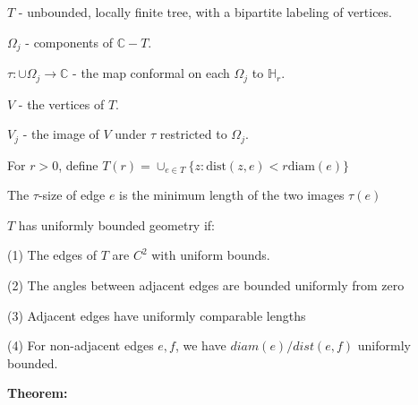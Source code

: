 \documentclass{beamer}
\begin{document}
\begin{frame}

{\tiny $T$ - unbounded, locally finite tree, with a bipartite labeling of vertices.

$\Omega_j$ - components of $\mathbb{C}-T$.

$\tau: \cup \Omega_j \rightarrow \mathbb{C}$ - the map conformal on each $\Omega_j$ to $\mathbb{H}_r$.

$V$ - the vertices of $T$. 

$V_j$ - the image of $V$ under $\tau$ restricted to $\Omega_j$.

For $r > 0$, define $T(r) = \cup_{e\in T} \{z : \textrm{dist}(z,e) < r\textrm{diam}(e) \}$

The $\tau$-size of edge $e$ is the minimum length of the two images $\tau(e)$

\vspace{2.5mm}

$T$ has uniformly bounded geometry if: 

\hspace{5mm} (1) The edges of $T$ are $C^2$ with uniform bounds. 

\hspace{5mm} (2) The angles between adjacent edges are bounded uniformly from zero

\hspace{5mm} (3) Adjacent edges have uniformly comparable lengths

\hspace{5mm} (4) For non-adjacent edges $e, f$, we have $diam(e)/dist(e,f)$ uniformly bounded. 

 }

\vspace{5mm}

{\bf Theorem:} {\it    }  

\end{frame}
\end{document}
